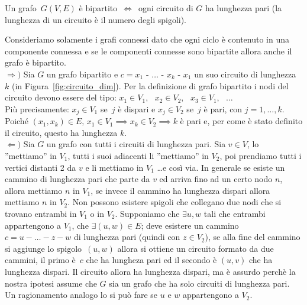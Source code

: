 \begin{thm}
Un grafo~$G(V,E)$ è bipartito~$\iff$~ogni circuito di $G$ ha lunghezza pari
(la lunghezza di un circuito è il numero degli spigoli).
\end{thm}
\proof
Consideriamo solamente i grafi connessi dato che ogni ciclo è contenuto in una componente
connessa e se le componenti connesse sono bipartite allora anche il grafo è bipartito.\\
$\Longrightarrow)$ Sia $G$ un grafo bipartito e ${c = x_1\text{ - }\dots\text{ - }x_k\text{ - }x_1}$
un suo circuito di lunghezza $k$ (in Figura~\ref{fig:circuito_dim}).
Per la definizione di grafo bipartito i nodi del circuito devono essere del tipo:
${x_1 \in V_1,}\text{ }{x_2 \in V_2,}\text{ }{x_3 \in V_1,\text{ }\dots}$\\ 
Più precisamente: ${x_j \in V_1}$ se~$j$ è dispari e ${x_j \in V_2}$ se~$j$ è pari, con
${j = 1,\dots,k}$.\\
Poiché ${(x_1, x_k) \in E} \text{, } {x_1 \in V_1 \implies x_k \in V_2 \implies k}$ è pari
e, per come è stato definito il circuito, questo ha lunghezza $k$.\\
$\Longleftarrow)$ Sia $G$ un grafo con tutti i circuiti di lunghezza pari. Sia $v \in V$,
lo ''mettiamo'' in $V_1$, tutti i suoi adiacenti li ''mettiamo'' in $V_2$, poi prendiamo
tutti i vertici distanti 2 da $v$ e li mettiamo in $V_1$ \dots e così via.
In generale se esiste un cammino di lunghezza pari che parte da $v$ ed arriva fino ad un certo
nodo $n$, allora mettiamo $n$ in $V_1$, se invece il cammino ha lunghezza dispari allora
mettiamo $n$ in $V_2$.
Non possono esistere spigoli che collegano due nodi che si trovano entrambi in $V_1$ o in $V_2$.
Supponiamo che $\exists u,w$ tali che entrambi appartengono a $V_1$, che ${\exists (u,w) \in E}$;
deve esistere un cammino ${c = u - \dots - z - w}$ di lunghezza pari (quindi con ${z \in V_2}$),
se alla fine del cammino si aggiunge lo spigolo~$(u,w)$ allora si ottiene un circuito formato da
due cammini, il primo è~$c$ che ha lungheza pari ed il secondo è $(u,v)$ che ha lunghezza dispari.
Il circuito allora ha lunghezza dispari, ma è assurdo perchè la nostra ipotesi assume che $G$ 
sia un grafo che ha solo circuiti di lunghezza pari. Un ragionamento analogo lo si può fare se
$u$ e $w$ appartengono a $V_2$.
